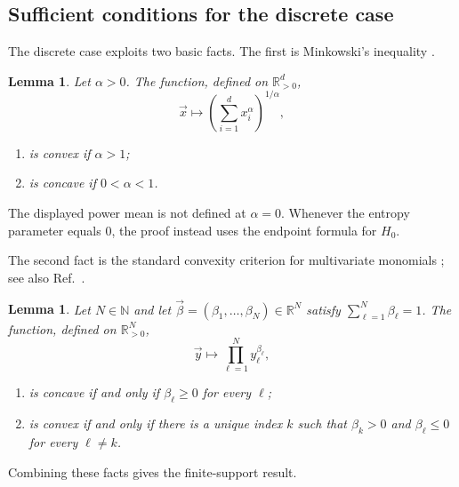 \documentclass[aps,pra,11pt,onecolumn,nofootinbib,tightenlines]{revtex4-2}
\newtheorem{lemma}[theorem]{Lemma}
\theoremstyle{definition}
\newcommand{\mb}[1]{\mathbb{#1}}
\newcommand{\R}{\mathbb{R}}
\begin{document}
\subsection{Sufficient conditions for the discrete case}

The discrete case exploits two basic facts.  The first is Minkowski's inequality
\cite[Theorem~9]{bullen2013handbook}.

\begin{lemma}
\label{lem:Minkowski}
Let $\alpha>0$.  The function, defined on
$\R^d_{>0}$,
\begin{equation}
\vec{x}\longmapsto\left(\sum_{i=1}^d x_i^\alpha\right)^{1/\alpha},
\end{equation}
\begin{enumerate}[itemsep=1pt]
\item is convex if $\alpha>1$;
\item is concave if $0<\alpha<1$.
\end{enumerate}
\end{lemma}

The displayed power mean is not defined at $\alpha=0$.  Whenever the entropy
parameter equals $0$, the proof instead uses the endpoint formula for $H_0$.

The second fact is the standard convexity criterion for multivariate monomials
\cite[Lemma~8]{mu21_renyi}; see also Ref.~\cite[Proposition~13]{farooq2024matrix}.

\begin{lemma}
\label{lem:Matrix-majorization}
Let $N\in\mb{N}$ and let
$\vec{\beta}=(\beta_1,\ldots,\beta_N)\in\R^N$ satisfy
$\sum_{\ell=1}^N\beta_\ell=1$.  The function, defined on
$\R^N_{>0}$,
\begin{equation}
\vec{y}\longmapsto\prod_{\ell=1}^N y_\ell^{\beta_\ell},
\end{equation}
\begin{enumerate}[itemsep=1pt]
\item is concave if and only if $\beta_\ell\geq0$ for every $\ell$;
\item is convex if and only if there is a unique index $k$ such that
$\beta_k>0$ and $\beta_\ell\leq0$ for every $\ell\neq k$.
\end{enumerate}
\end{lemma}

Combining these facts gives the finite-support result.
\end{document}
